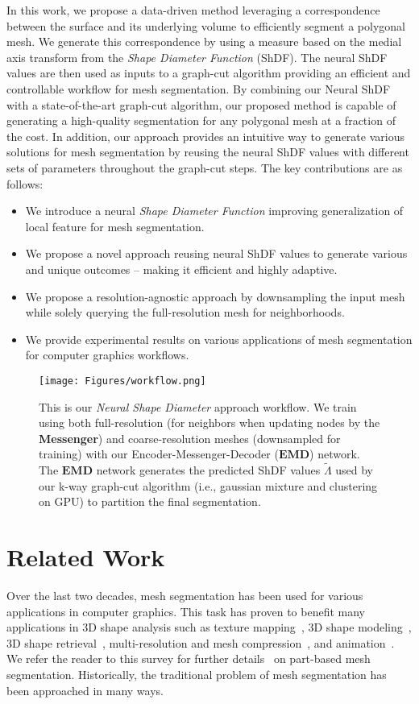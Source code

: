 In this work, we propose a data-driven method leveraging a correspondence between the surface and its underlying volume to efficiently segment a polygonal mesh. We generate this correspondence by using a measure based on the medial axis transform from the \textit{Shape Diameter Function} (ShDF). The neural ShDF values are then used as inputs to a graph-cut algorithm providing an efficient and controllable workflow for mesh segmentation. By combining our Neural ShDF with a state-of-the-art graph-cut algorithm, our proposed method is capable of generating a high-quality segmentation for any polygonal mesh at a fraction of the cost. In addition, our approach provides an intuitive way to generate various solutions for mesh segmentation by reusing the neural ShDF values with different sets of parameters throughout the graph-cut steps. The key contributions are as follows:
\begin{itemize}
    \item{We introduce a neural \textit{Shape Diameter Function} improving generalization of local feature for mesh segmentation.}
    \item{We propose a novel approach reusing neural ShDF values to generate various and unique outcomes -- making it efficient and highly adaptive.}
    \item{We propose a resolution-agnostic approach by downsampling the input mesh while solely querying the full-resolution mesh for neighborhoods.}
    \item{We provide experimental results on various applications of mesh segmentation for computer graphics workflows.}
\end{itemize}

\begin{figure*}[t]
  \centering
   \texttt{[image: Figures/workflow.png]}
   \caption{This is our \textit{Neural Shape Diameter} approach workflow. We train using both full-resolution (for neighbors when updating nodes by the \textbf{Messenger}) and coarse-resolution meshes (downsampled for training) with our Encoder-Messenger-Decoder ($\textbf{EMD}$) network. The $\textbf{EMD}$ network generates the predicted ShDF values $\tilde{\Lambda}$ used by our k-way graph-cut algorithm (i.e., gaussian mixture and clustering on GPU) to partition the final segmentation.}
   \label{fig:workflow}
\end{figure*}

\section{Related Work}
Over the last two decades, mesh segmentation has been used for various applications in computer graphics. This task has proven to benefit many applications in 3D shape analysis such as texture mapping~\cite{sander2003multi}, 3D shape modeling~\cite{ji2006easy}, 3D shape retrieval~\cite{ferreira2010thesaurus}, multi-resolution and mesh compression~\cite{maglo2011cluster}, and animation~\cite{yuan2016space}. We refer the reader to this survey for further details~\cite{rodrigues2018part} on part-based mesh segmentation. Historically, the traditional problem of mesh segmentation has been approached in many ways.

